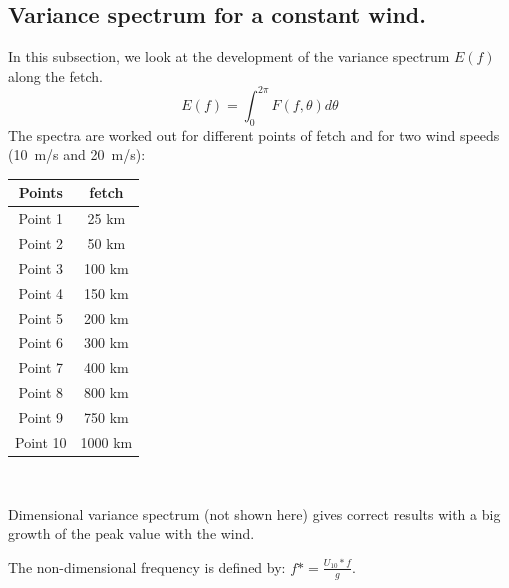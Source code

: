 \subsection{Variance spectrum for a constant wind.}
In this subsection, we look at the development of the variance spectrum $E(f)$
along the fetch.
\[ E(f) = \int_{0}^{2\pi} F(f,\theta )d\theta
\]
The spectra are worked out for different points of fetch and for two wind
speeds (10~m/s and 20~m/s):\\
\begin{center}
\begin{tabular}{c|c}
Points & fetch\\
\hline
Point 1 & 25 km \\
Point 2 & 50 km \\
Point 3 & 100 km \\
Point 4 & 150 km \\
Point 5 & 200 km\\
Point 6 & 300 km \\
Point 7 & 400 km \\
Point 8 & 800 km\\
Point 9 & 750 km\\
Point 10 & 1000 km\\
\end{tabular}\\
\end{center}
Dimensional variance spectrum (not shown here) gives correct results with a big
growth of the peak value with the wind.

The non-dimensional frequency is defined by: $f* = \frac{U_{10}*f}{g}$.


